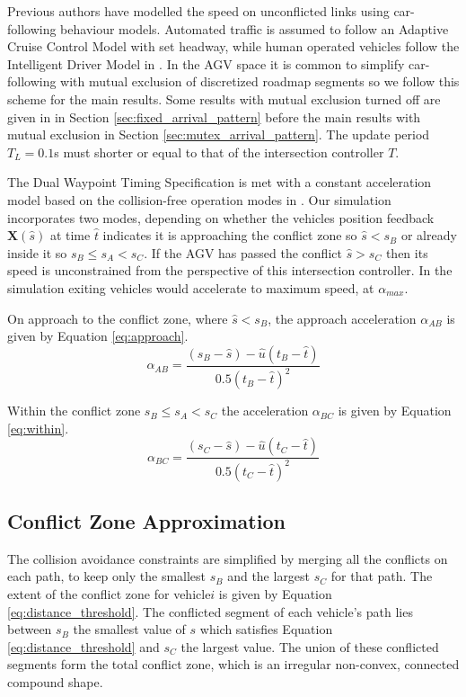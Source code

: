 Previous authors have modelled the speed on unconflicted links using car-following behaviour models. Automated traffic is assumed to follow an Adaptive Cruise Control Model with set headway, while human operated vehicles follow the Intelligent Driver Model in \cite{Baz2020}. In the AGV space it is common to simplify car-following with mutual exclusion of discretized roadmap segments  \cite{Digani2014coord} so we follow this scheme for the main results. Some results with mutual exclusion turned off are given in  in Section \ref{sec:fixed_arrival_pattern} before the main results with mutual exclusion in Section \ref{sec:mutex_arrival_pattern}. The update period $T_L=0.1$s must shorter or equal to that of the intersection controller $T$. 

The Dual Waypoint Timing Specification is met with a constant acceleration model based on the collision-free operation modes in \cite{He2020}. 
Our simulation incorporates two modes, depending on whether the vehicles position feedback $\bm{X}(\hat{s})$ at time $\hat{t}$ indicates it is approaching the conflict zone so $\hat{s}<s_B$ or already inside it so $s_B\leq s_A<s_C$. If the AGV has passed the conflict $\hat{s}>s_C$ then its speed is unconstrained from the perspective of this intersection controller. In the simulation exiting vehicles would accelerate to maximum speed, at $\alpha_{max}$.

On approach to the conflict zone, where $\hat{s}<s_B$, the approach acceleration $\alpha_{AB}$ is given by Equation \ref{eq:approach}.
\begin{equation}
\alpha_{AB} = \frac{(s_B - \hat{s}) - \hat{u}(t_B - \hat{t}) }{0.5 (t_B - \hat{t})^2}
\label{eq:approach}
\end{equation}

Within the conflict zone $s_B \leq s_A<s_C$ the acceleration $\alpha_{BC}$ is given by Equation \ref{eq:within}.
\begin{equation}
\alpha_{BC} = \frac{(s_C - \hat{s}) - \hat{u}(t_C - \hat{t}) }{0.5 (t_C - \hat{t})^2}
\label{eq:within}
\end{equation}

\subsection{Conflict Zone Approximation}
\label{sec:conflict_zone}
The collision avoidance constraints are simplified by merging all the conflicts on each path, to keep only the smallest $s_B$ and the largest $s_C$ for that path. The extent of the conflict zone for vehicle$i$ is given by Equation \ref{eq:distance_threshold}. The conflicted segment of each vehicle's path lies between $s_B$ the smallest value of $s$ which satisfies Equation \ref{eq:distance_threshold} and $s_C$ the largest value. The union of these conflicted segments form the total conflict zone, which is an irregular non-convex, connected compound shape. 


